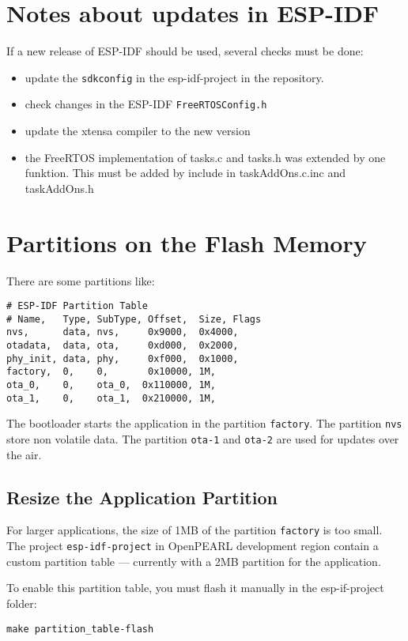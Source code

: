\section{Notes about updates in ESP-IDF}
If a new release of ESP-IDF should be used, several checks must be done:
\begin{itemize}
\item update the \verb|sdkconfig| in the esp-idf-project in the repository.
\item check changes in the ESP-IDF \verb|FreeRTOSConfig.h|
\item update the xtensa compiler to the new version
\item the FreeRTOS implementation of tasks.c and tasks.h was extended by one
  funktion. This must be added by include in taskAddOns.c.inc and taskAddOns.h
\end{itemize}

\section{Partitions on the Flash Memory}
There are some partitions like:

\begin{verbatim}
# ESP-IDF Partition Table
# Name,   Type, SubType, Offset,  Size, Flags
nvs,      data, nvs,     0x9000,  0x4000,
otadata,  data, ota,     0xd000,  0x2000,
phy_init, data, phy,     0xf000,  0x1000,
factory,  0,    0,       0x10000, 1M,
ota_0,    0,    ota_0,  0x110000, 1M,
ota_1,    0,    ota_1,  0x210000, 1M,
\end{verbatim}
The bootloader starts the application in the partition \texttt{factory}.
The partition \texttt{nvs} store non volatile data.
The partition \texttt{ota-1} and \texttt{ota-2} are used for updates over the air.

\subsection{Resize the Application Partition}
For larger applications, the size of 1MB of the partition \texttt{factory} is too small.
The project \texttt{esp-idf-project} in OpenPEARL development region contain a custom 
partition table --- currently with a 2MB partition for the application.

To enable this partition table, you must flash it manually in the esp-if-project folder:
\begin{verbatim}
make partition_table-flash
\end{verbatim}

